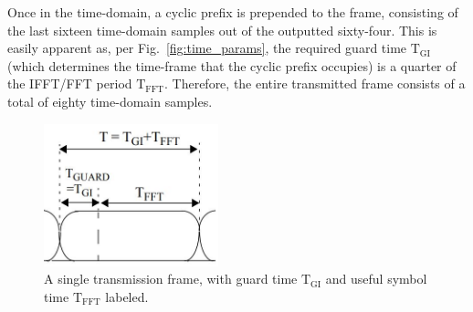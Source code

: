 \documentclass[journal]{IEEEtran}
\begin{document}
Once in the time-domain, a cyclic prefix is prepended to the frame, consisting of the last sixteen time-domain samples out of the outputted sixty-four. This is easily apparent as, per Fig.~\ref{fig:time_params}, the required guard time $\text{T}_\text{GI}$ (which determines the time-frame that the cyclic prefix occupies) is a quarter of the IFFT/FFT period $\text{T}_\text{FFT}$. Therefore, the entire transmitted frame consists of a total of eighty time-domain samples.
\begin{figure}
    \centering
    \includegraphics[width = 0.45\textwidth]{Frame}
    \caption{A single transmission frame, with guard time $\text{T}_\text{GI}$ and useful symbol time $\text{T}_\text{FFT}$ labeled.}
    \label{fig:Frame}
\end{figure}






%	
\end{document}
